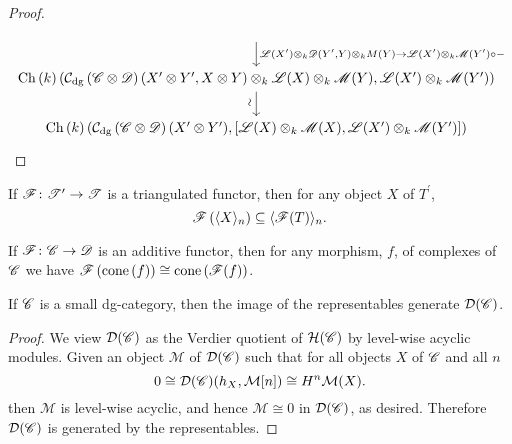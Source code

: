 \documentclass[dissertation.tex]{subfiles}
\begin{document}
\begin{lem}
\begin{proof}
$$\begin{tikzcd}
              \arrow{d}{\funct{L}(X^\prime) \otimes_k \D(Y^\prime,Y) \otimes_k M(Y) \to \funct{L}(X^\prime) \otimes_k \funct{M}(Y^\prime) \circ -}\\
              \Ch{k}(\cdg{\CC \otimes \D}(X^\prime \otimes Y^\prime, X \otimes Y) \otimes_k \funct{L}(X) \otimes_k \funct{M}(Y), \funct{L}(X^\prime) \otimes_k \funct{M}(Y^\prime))\arrow{d}[rotate=90,xshift=-1ex,yshift=1ex]{\sim}\\
              \Ch{k}(\cdg{\CC \otimes \D}(X^\prime \otimes Y^\prime), [\funct{L}(X) \otimes_k \funct{M}(X), \funct{L}(X^\prime) \otimes_k \funct{M}(Y^\prime)])
            \end{tikzcd}$$
          \end{proof}
        \end{lem}

        \begin{lem}\label{TriangulatedFunctorsPreserveGens}
          If $\mathscr{F} \colon \mathscr{T}^\prime \to \mathscr{T}$ is a triangulated functor, then for any object $X$ of $T^\prime$, 
          $$\mathscr{F}\left(\langle X \rangle_n\right) \subseteq \langle \mathscr{F}(T) \rangle_n.$$
        \end{lem}

        \begin{lem}\label{AdditiveFunctorsCommuteWithCones}
          If $\mathscr{F} \colon \mathscr{C} \rightarrow \mathscr{D}$ is an additive functor, then for any morphism, $f$, of complexes of $\mathscr{C}$ we have
          $\mathscr{F}\left(\operatorname{cone}\left(f\right)\right) \cong \operatorname{cone}\left(\mathscr{F}(f)\right)$.
        \end{lem}

        \begin{lem}\label{RepresentablesGenerateSmallDG}
          If $\mathscr{C}$ is a small dg-category, then the image of the representables generate $\mathcal{D}(\mathscr{C})$.

          \begin{proof}
            We view $\mathcal{D}(\mathscr{C})$ as the Verdier quotient of $\mathcal{H}(\mathscr{C})$ by level-wise acyclic modules.
            Given an object $\mathcal{M}$ of $\mathcal{D}(\mathscr{C})$ such that for all objects $X$ of $\mathscr{C}$ and all $n$
            $$0 \cong \mathcal{D}(\mathscr{C})(h_X, \mathcal{M}[n]) \cong H^n\mathcal{M}(X).$$
            then $\mathcal{M}$ is level-wise acyclic, and hence $\mathcal{M} \cong 0$ in $\mathcal{D}(\mathscr{C})$, as desired.
            Therefore $\mathcal{D}(\mathscr{C})$ is generated by the representables.
          \end{proof}
        \end{lem}
\end{document}
